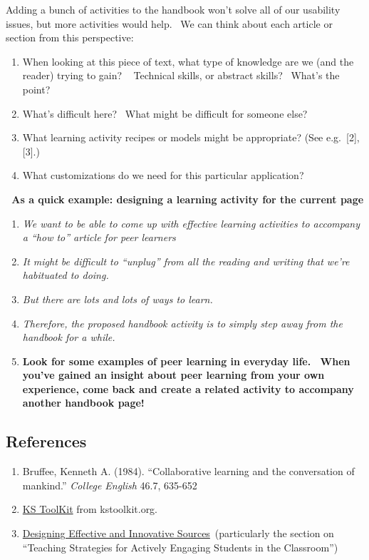 Adding a bunch of activities to the handbook won't solve all of our
usability issues, but more activities would help.~ We can think about
each article or section from this perspective:

\begin{enumerate}
\def\labelenumi{\arabic{enumi}.}
\item
  When looking at this piece of text, what type of knowledge are we (and
  the reader) trying to gain? ~ Technical skills, or abstract skills?~
  What's the point?
\item
  What's difficult here? ~What might be difficult for someone else?
\item
  What learning activity recipes or models might be appropriate? (See
  e.g.~{{[}2{]}}, {{[}3{]}}.)
\item
  What customizations do we need for this particular application?
\end{enumerate}

\textbf{\emph{~}As a quick example: designing a learning activity for
the current page}

\begin{enumerate}
\def\labelenumi{\arabic{enumi}.}
\item
  \emph{We want to be able to come up with effective learning activities
  to accompany a ``how to'' article for peer learners}
\item
  \emph{It might be difficult to ``unplug'' from all the reading and
  writing that we're habituated to doing.}
\item
  \emph{But there are lots and lots of ways to learn.}
\item
  \emph{Therefore, the proposed handbook activity is to simply step away
  from the handbook for a while.}
\item
  \textbf{Look for some examples of peer learning in everyday life.~
  When you've gained an insight about peer learning from your own
  experience, come back and create a related activity to accompany
  another handbook page!}
\end{enumerate}

\subsection{References}\label{references}

\begin{enumerate}
\def\labelenumi{\arabic{enumi}.}
\item
  Bruffee, Kenneth A. (1984). ``Collaborative learning and the
  conversation of mankind.'' \emph{College English} 46.7, 635-652
\item
  \href{http://www.kstoolkit.org/KS+Methods}{KS ToolKit} from
  kstoolkit.org.
\item
  \href{http://serc.carleton.edu/NAGTWorkshops/coursedesign/tutorial/strategies.html}{Designing
  Effective and Innovative Sources}~(particularly the section on
  ``Teaching Strategies for Actively Engaging Students in the
  Classroom'')
\end{enumerate}

